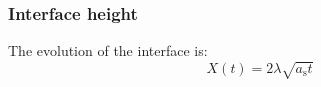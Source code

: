 %
%
\subsubsection{Interface height}


The evolution of the interface is:
\begin{equation}
X(t)=2 \lambda \sqrt{a_{\mathrm{s}} t}
\label{3.42}
\end{equation}

